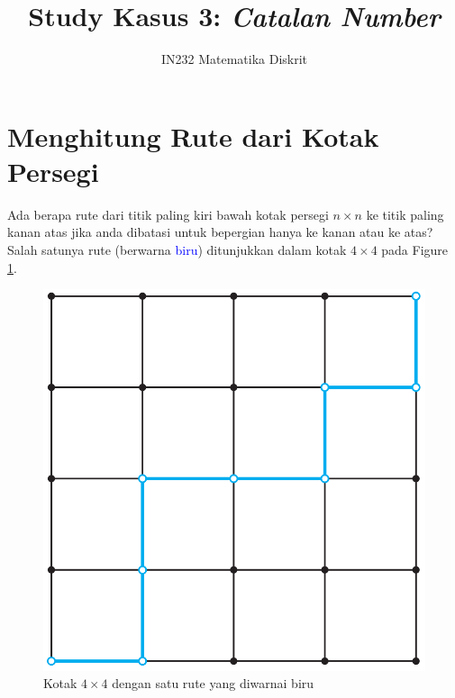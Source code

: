 \documentclass{article}
\title{Study Kasus 3: \textit{Catalan Number}}
\author{IN232 Matematika Diskrit}
\date{}
\theoremstyle{plain}
\begin{document}
\maketitle


\section*{Menghitung Rute dari Kotak Persegi}
Ada berapa rute dari titik paling kiri bawah kotak persegi $n \times n$ ke titik paling kanan atas jika anda dibatasi untuk bepergian hanya ke kanan atau ke atas? Salah satunya rute (berwarna \textcolor{blue}{biru}) ditunjukkan dalam kotak $4 \times 4$ pada Figure \ref{fig:4-by-4-grid}.

\begin{figure}[!ht]
	\centering
	\includegraphics[scale=.225]{images/4-by-4-grid}
	\caption{Kotak $4 \times 4$ dengan satu rute yang diwarnai biru \citep{johnsonbaugh2009discrete}}
	\label{fig:4-by-4-grid}
\end{figure}
\end{document}
